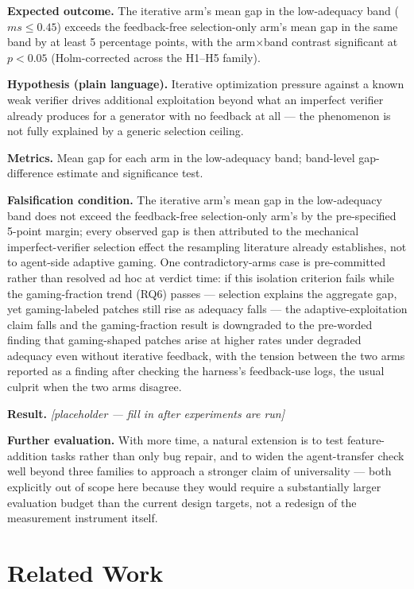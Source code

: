 \documentclass[11pt]{article}
\newcommand{\ph}{\textit{[placeholder --- fill in after experiments are run]}}
\begin{document}
\textbf{Expected outcome.} The iterative arm's mean gap in the low-adequacy band ($ms \le 0.45$) exceeds the feedback-free selection-only arm's mean gap in the same band by at least 5 percentage points, with the arm$\times$band contrast significant at $p<0.05$ (Holm-corrected across the H1--H5 family).

\textbf{Hypothesis (plain language).} Iterative optimization pressure against a known weak verifier drives additional exploitation beyond what an imperfect verifier already produces for a generator with no feedback at all --- the phenomenon is not fully explained by a generic selection ceiling.

\textbf{Metrics.} Mean gap for each arm in the low-adequacy band; band-level gap-difference estimate and significance test.

\textbf{Falsification condition.} The iterative arm's mean gap in the low-adequacy band does not exceed the feedback-free selection-only arm's by the pre-specified 5-point margin; every observed gap is then attributed to the mechanical imperfect-verifier selection effect the resampling literature already establishes, not to agent-side adaptive gaming. One contradictory-arms case is pre-committed rather than resolved ad hoc at verdict time: if this isolation criterion fails while the gaming-fraction trend (RQ6) passes --- selection explains the aggregate gap, yet gaming-labeled patches still rise as adequacy falls --- the adaptive-exploitation claim falls and the gaming-fraction result is downgraded to the pre-worded finding that gaming-shaped patches arise at higher rates under degraded adequacy even without iterative feedback, with the tension between the two arms reported as a finding after checking the harness's feedback-use logs, the usual culprit when the two arms disagree.

\textbf{Result.} \ph

\vspace{0.5em}
\noindent\textbf{Further evaluation.} With more time, a natural extension is to test feature-addition tasks rather than only bug repair, and to widen the agent-transfer check well beyond three families to approach a stronger claim of universality --- both explicitly out of scope here because they would require a substantially larger evaluation budget than the current design targets, not a redesign of the measurement instrument itself.

\section{Related Work}
\end{document}
